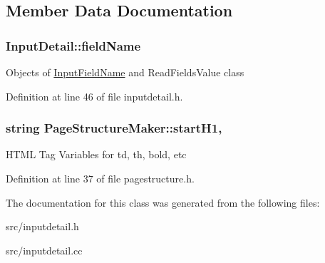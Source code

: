 \subsection{Member Data Documentation}
\hypertarget{classInputDetail_ac6f85380c5152c406d483726382c4798}{
\subsubsection[{field\-Name}]{ Input\-Detail\-::field\-Name\hspace{0.3cm}{\ttfamily [protected]}}}\label{classInputDetail_ac6f85380c5152c406d483726382c4798}
Objects of \hyperlink{classInputFieldName}{Input\-Field\-Name} and Read\-Fields\-Value class 

Definition at line 46 of file inputdetail.\-h.

\hypertarget{classPageStructureMaker_af41d4e21b808f5f8dc2c727f775b6fb2}{
\subsubsection[{start\-H1}]{\setlength{\rightskip}{0pt plus 5cm}string Page\-Structure\-Maker\-::start\-H1\hspace{0.3cm}{\ttfamily [protected]}, {\ttfamily [inherited]}}}\label{classPageStructureMaker_af41d4e21b808f5f8dc2c727f775b6fb2}
H\-T\-M\-L Tag Variables for td, th, bold, etc 

Definition at line 37 of file pagestructure.\-h.



The documentation for this class was generated from the following files\-:\begin{DoxyCompactItemize}
\item 
src/inputdetail.\-h\item 
src/inputdetail.\-cc\end{DoxyCompactItemize}
